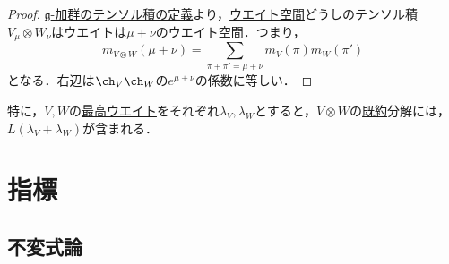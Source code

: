 \documentclass[rep_main]{subfiles}
\begin{document}
\begin{proof}
	\hyperref[def:gmod-tensor]{$\mathfrak{g}$-加群のテンソル積の定義}より，\hyperref[def:weight-rep]{ウエイト空間}どうしのテンソル積$V_\mu \otimes W_\nu$は\hyperref[def:weight-rep]{ウエイト}は$\mu + \nu$の\hyperref[def:weight-rep]{ウエイト空間}．つまり，
	\begin{equation}
		m_{V \otimes W}(\mu + \nu) = \sum_{\pi + \pi' = \mu + \nu} m_V(\pi)m_W(\pi')
	\end{equation}
	となる．右辺は$\ch_V\ch_W$の$e^{\mu + \nu}$の係数に等しい．
\end{proof}
特に，$V, W$の\hyperref[def:highest-weight-module]{最高ウエイト}をそれぞれ$\lambda_V, \lambda_W$とすると，$V \otimes W$の\hyperref[def:irr]{既約}分解には，$L(\lambda_V + \lambda_W)$が含まれる．

\section{指標}



\subsection{不変式論}
\end{document}
